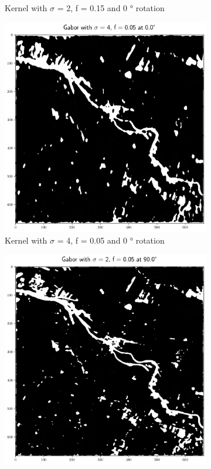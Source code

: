 \documentclass[12pt,a4paper, english]{article}
\begin{document}
\begin{figure}[!htbp]
\begin{subfigure}[b]{0.45\textwidth}
         \caption{Kernel with $\sigma$ = 2, f = 0.15 and 0 ° rotation}\label{fig:feat02}
     \end{subfigure}

     \begin{subfigure}[b]{0.45\textwidth}
         \centering
         \includegraphics[width=\textwidth]{img/Features_4_005_0.png}
         \caption{Kernel with $\sigma$ = 4, f = 0.05 and 0 ° rotation}\label{fig:feat03}
     \end{subfigure}
     \hfill
     \begin{subfigure}[b]{0.45\textwidth}
         \centering
         \includegraphics[width=\textwidth]{img/Features_2_005_90.png}

\end{subfigure}
\end{figure}
\end{document}
